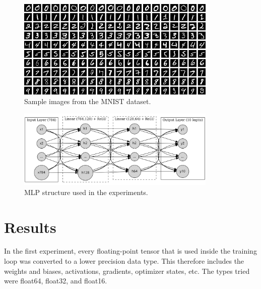 \documentclass[11pt]{article}
\begin{document}
\begin{figure}[H]
	\centering
	\includegraphics[width=0.85\textwidth]{figures/mnist.png}
	\caption{Sample images from the MNIST dataset.}\label{fig:mnistSample}
\end{figure}

\begin{figure}[H]
	\centering
	\includegraphics[width=0.85\textwidth]{figures/mlpStruc.png}
	\caption{MLP structure used in the experiments.}\label{fig:mlpStructure}
\end{figure}

\newpage
\section{Results}
In the first experiment, every floating-point tensor that is used inside the
training loop was converted to a lower precision data type. This therefore
includes the weights and biases, activations, gradients, optimizer states, etc.
The types tried were float64, float32, and float16.
\end{document}
